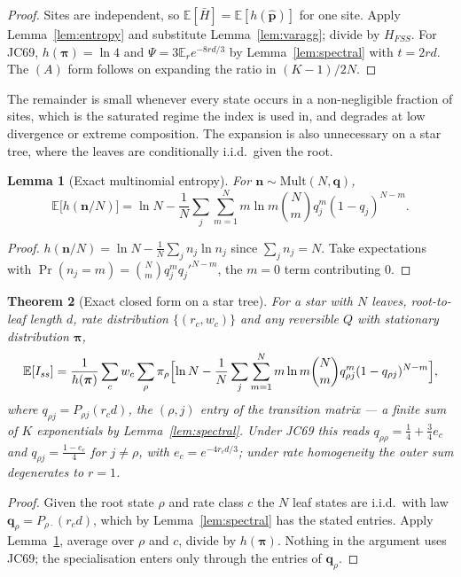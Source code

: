 \documentclass[11pt]{article}
\newcommand{\Iss}{I_{ss}}
\newcommand{\Hbar}{\bar H}
\newcommand{\HFSS}{H_{FSS}}
\newcommand{\bpi}{\boldsymbol{\pi}}
\newcommand{\E}{\mathbb{E}}
\newcommand{\Mult}{\mathrm{Mult}}
\newtheorem{theorem}{Theorem}
\newtheorem{lemma}[theorem]{Lemma}
\theoremstyle{definition}
\theoremstyle{remark}
\begin{document}
\begin{proof}
Sites are independent, so $\E[\Hbar]=\E[h(\hat{\mathbf p})]$ for one site.
Apply Lemma~\ref{lem:entropy} and substitute Lemma~\ref{lem:varagg}; divide by
$\HFSS$. For JC69, $h(\bpi)=\ln4$ and $\Psi=3\E_r e^{-8rd/3}$ by
Lemma~\ref{lem:spectral} with $t=2rd$. The $(A)$ form follows on expanding
the ratio in $(K-1)/2N$.
\end{proof}

The remainder is small whenever every state occurs in a non-negligible
fraction of sites, which is the saturated regime the index is used in, and
degrades at low divergence or extreme composition. The expansion is also
unnecessary on a star tree, where the leaves are conditionally i.i.d.\ given
the root.

\begin{lemma}[Exact multinomial entropy]
\label{lem:multinomial}
For $\mathbf n\sim\Mult(N,\mathbf q)$,
\begin{equation}
  \E\bigl[h(\mathbf n/N)\bigr]=\ln N-\frac1N\sum_j\sum_{m=1}^{N}
  m\ln m\binom Nm q_j^{m}(1-q_j)^{N-m}.
\end{equation}
\end{lemma}

\begin{proof}
$h(\mathbf n/N)=\ln N-\frac1N\sum_jn_j\ln n_j$ since $\sum_jn_j=N$. Take
expectations with $\Pr(n_j=m)=\binom Nm q_j^mq_j'^{N-m}$, the $m=0$ term
contributing $0$.
\end{proof}

\begin{theorem}[Exact closed form on a star tree]
\label{thm:exact}
For a star with $N$ leaves, root-to-leaf length $d$, rate distribution
$\{(r_c,w_c)\}$ and \emph{any} reversible $Q$ with stationary distribution
$\bpi$,
\begin{equation}
  \E[\Iss]=\frac{1}{h(\bpi)}\sum_c w_c\sum_\rho\pi_\rho
  \Bigl[\ln N-\frac1N\sum_j\sum_{m=1}^{N}m\ln m\binom Nm
  q_{\rho j}^{m}(1-q_{\rho j})^{N-m}\Bigr],
  \label{eq:exactstar}
\end{equation}
where $q_{\rho j}=P_{\rho j}(r_cd)$, the $(\rho,j)$ entry of the transition
matrix --- a finite sum of $K$ exponentials by Lemma~\ref{lem:spectral}.
Under JC69 this reads $q_{\rho\rho}=\tfrac14+\tfrac34e_c$ and
$q_{\rho j}=\tfrac{1-e_c}{4}$ for $j\ne\rho$, with $e_c=e^{-4r_cd/3}$; under
rate homogeneity the outer sum degenerates to $r=1$.
\end{theorem}

\begin{proof}
Given the root state $\rho$ and rate class $c$ the $N$ leaf states are
i.i.d.\ with law $\mathbf q_\rho=P_{\rho\cdot}(r_cd)$, which by
Lemma~\ref{lem:spectral} has the stated entries. Apply
Lemma~\ref{lem:multinomial}, average over $\rho$ and $c$, divide by $h(\bpi)$.
Nothing in the argument uses JC69; the specialisation enters only through the
entries of $\mathbf q_\rho$.
\end{proof}
\end{document}
